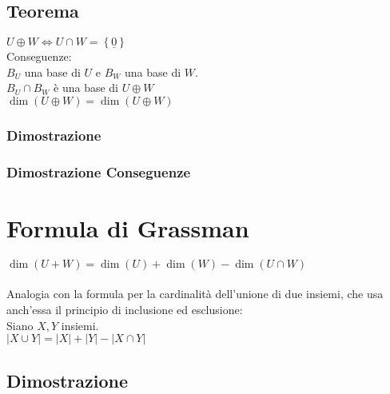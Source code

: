 \documentclass[a4paper, twoside, italian, 11pt]{book}
\newcommand{\braces}[1] {\left \{ #1 \right \}}
\newcommand{\card}[1] {\left | #1 \right |}
\begin{document}
\subsection{Teorema}

$U \oplus W \iff U \cap W = \braces{\underline 0}$ \\

\noindent
Conseguenze: \\

\noindent
$B_U$ una base di $U$ e $B_W$ una base di $W$. \\
$B_U \cap B_W$ è una base di $U \oplus W$ \\

\noindent
$\dim(U \oplus W) = \dim(U \oplus W)$


\subsubsection{Dimostrazione}



\subsubsection{Dimostrazione Conseguenze}




\section{Formula di Grassman}

$\dim(U + W) = \dim(U) + \dim(W) - \dim(U \cap W)$ \\\\

\noindent
Analogia con la formula per la cardinalità dell'unione di due insiemi, che usa anch'essa il principio di inclusione ed esclusione: \\

\noindent
Siano $X, Y$ insiemi. \\

\noindent
$\card{X \cup Y} = \card X + \card Y - \card{X \cap Y}$


\subsection{Dimostrazione}

\end{document}
